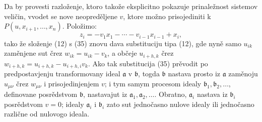 \documentclass[11pt]{article}
\providecommand{\aideal}{\mathfrak a}
\providecommand{\bideal}{\mathfrak b}
\begin{document}
Da by provesti razloženje, ktoro takože eksplicitno pokazuje prinaležnost sistemov veličin, vvodet se nove neopreděljene $v$, ktore možno prisojediniti k $P(u,x_{i+1},\ldots,x_n)$. Položimo:
\begin{equation}
 z_i=-v_1x_1-\cdots-v_{i-1}x_{i-1}+x_i,
\tag{35}
\end{equation}
tako že složenje (12) s (35) znovu dava substituciju tipa (12), gde nyně samo $u_{ik}$ zaměnjene sut črez $w_{ik}=u_{ik}-v_k$, a občeje $u_{i+h,k}$ črez $w_{i+h,k}=u_{i+h,k}-u_{i+h,i}v_k$. Ako tak substitucija (35) prěvodit po predpostavjenju transformovany ideal $\aideal$ v $\bideal$, togda $\bideal$ nastava prosto iz $\aideal$ zaměnoju $u_{\mu\nu}$ črez $w_{\mu\nu}$ i prisojedinjenjem $v$; i tym samym procesom idealy $\bideal_1,\bideal_2,\ldots$, definovane posrědstvom $\bideal$, nastavajut iz $\aideal_1,\aideal_2,\ldots$. Obratno, $\aideal_i$ nastava iz $\bideal_i$ posrědstvom $v=0$; idealy $\aideal_i$ i $\bideal_i$ zato sut jednočasno nulove idealy ili jednočasno različne od nulovogo ideala.
\end{document}
